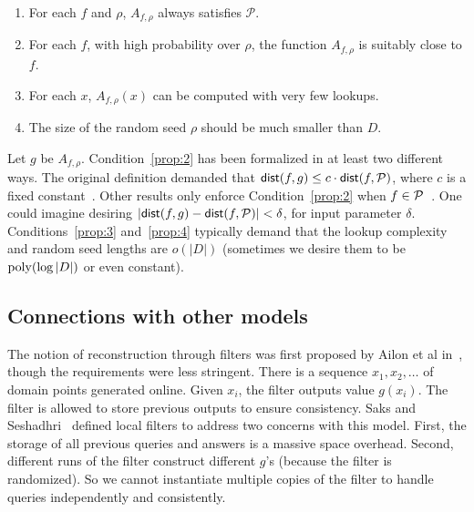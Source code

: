 \documentclass[natbib]{svcyclop}
\def\dist{{\sf dist}}
\begin{document}
\begin{enumerate}
\item \label{prop:1} For each $f$ and $\rho$,  $A_{f,\rho}$ 
always satisfies $\mathcal{P}$. 
\item \label{prop:2} For each $f$, with high probability over $\rho$, the function $A_{f,\rho}$ is suitably
close to $f$.
\item \label{prop:3} For each $x$, $A_{f,\rho}(x)$ can be computed with very few lookups.
\item \label{prop:4} The size of the random seed $\rho$ should be much smaller than $D$.
\end{enumerate}

Let $g$ be $A_{f,\rho}$. Condition~\ref{prop:2} has been formalized in at least two different ways. The original definition demanded that $\dist(f,g) \leq c\cdot \dist(f,\cP)$,
where $c$ is a fixed constant~\cite{SS06}. Other results only enforce Condition~\ref{prop:2} when
$f \in \mathcal{P}$~\cite{JhRa13,AwJh+12}. One could imagine desiring $|\dist(f,g) - \dist(f,\cP)| < \delta$,
for input parameter $\delta$.
%
Conditions~\ref{prop:3} and~\ref{prop:4} typically demand that the lookup complexity and random
seed lengths are $o(|D|)$ (sometimes we desire them to be $\mathrm{poly}(\log |D|)$ or even constant). 


%
%


\subsection{Connections with other models}


The notion of reconstruction through filters was first proposed by Ailon et al in~\cite{ACCL2},
though the requirements were less stringent. There is a sequence $x_1, x_2, \ldots$ of domain points generated
online. Given $x_i$, the filter outputs value $g(x_i)$. 
The filter is allowed to store previous outputs to ensure consistency. 
Saks and Seshadhri~\cite{SS06} defined local filters to address two concerns with this model.
First, the storage of all previous queries and answers is a massive space overhead. Second,
different runs of the filter construct different $g$'s (because the filter is randomized).
So we cannot instantiate multiple copies of the filter to handle queries independently and consistently.
\end{document}
